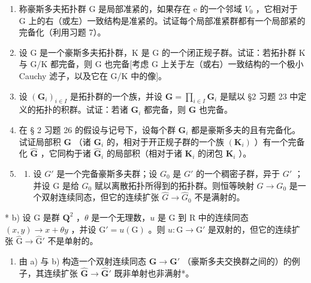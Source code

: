 \begin{enumerate}
\def\labelenumi{\arabic{enumi})}
\setcounter{enumi}{7}
\item
  称豪斯多夫拓扑群 G 是局部准紧的，如果存在 e 的一个邻域 \(V_{0}\) ，它相对于 G 上的右（或左）一致结构是准紧的。试证每个局部准紧群都有一个局部紧的完备化（利用习题 7）。
\item
  设 G 是一个豪斯多夫拓扑群，K 是 G 的一个闭正规子群。试证：若拓扑群 K 与 G/K 都完备，则 G 也完备{[}考虑 G 上关于左（或右）一致结构的一个极小 Cauchy 滤子，以及它在 G/K 中的像{]}。
\item
  设 \((\mathbf{G}_i)_{i\in I}\) 是拓扑群的一个族，并设 \(\mathbf{G} = \prod_{i\in I}\mathbf{G}_i\) 是赋以 §2 习题 23 中定义的拓扑的积群。试证：若诸 \(\mathbf{G}_i\) 都完备，则 \(\mathbf{G}\) 也完备。
\item
  在 § 2 习题 26 的假设与记号下，设每个群 \(\mathbf{G}_{i}\) 都是豪斯多夫的且有完备化。试证局部积 \(\mathbf{G}\) （诸 \(\mathbf{G}_{i}\) 的，相对于开正规子群的一个族 \((\mathbf{K}_{i})\) ）有一个完备化 \(\hat{\mathbf{G}}\) ，它同构于诸 \(\hat{\mathbf{G}}_{i}\) 的局部积（相对于诸 \(\mathbf{K}_{i}\) 的闭包 \(\mathbf{K}_{i}\) ）。
\item
  \begin{enumerate}
  \def\labelenumii{\alph{enumii})}
  \tightlist
  \item
    设 \(G'\) 是一个完备豪斯多夫群；设 \(G_{0}\) 是 \(G'\) 的一个稠密子群，异于 \(G'\) ；并设 G 是给 \(G_{0}\) 赋以离散拓扑所得到的拓扑群。则恒等映射 \(G \rightarrow G_{0}\) 是一个双射连续同态，但它的连续扩张 \(\hat{G} \rightarrow \hat{G}_{0}\) 不是满射的。
  \end{enumerate}
\end{enumerate}

* b) 设 G 是群 \(\mathbf{Q}^2\) ，\(\theta\) 是一个无理数，\(u\) 是 G 到 R 中的连续同态 \((x,y)\to x + \theta y\) ，并设 \(\mathrm{G}' = u(\mathrm{G})\) 。则 \(u: \mathrm{G}\to \mathrm{G}'\) 是双射的，但它的连续扩张 \(\hat{\mathrm{G}}\to \hat{\mathrm{G}}'\) 不是单射的。

\begin{enumerate}
\def\labelenumi{\alph{enumi})}
\setcounter{enumi}{2}
\tightlist
\item
  由 a) 与 b) 构造一个双射连续同态 \(\mathbf{G} \to \mathbf{G}'\) （豪斯多夫交换群之间的）的例子，其连续扩张 \(\hat{\mathbf{G}} \to \hat{\mathbf{G}}'\) 既非单射也非满射*。
\end{enumerate}

\BourbakiExerciseGroup

